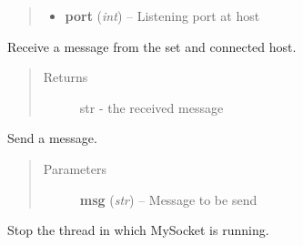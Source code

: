 \documentclass[letterpaper,10pt,english]{sphinxmanual}
\begin{document}
\begin{fulllineitems}
\begin{fulllineitems}
\begin{fulllineitems}
\begin{quote}
\begin{description}
\begin{itemize}
\item {} 
\textbf{port} (\emph{int}) -- Listening port at host

\end{itemize}

\end{description}\end{quote}

\end{fulllineitems}


\begin{fulllineitems}
\label{_static/code:FaceReader.FaceReader.MySocket.receive}
Receive a message from the set and connected host.
\begin{quote}\begin{description}
\item[{Returns}] \leavevmode
str - the received message

\end{description}\end{quote}

\end{fulllineitems}


\begin{fulllineitems}
\label{_static/code:FaceReader.FaceReader.MySocket.send}
Send a message.
\begin{quote}\begin{description}
\item[{Parameters}] \leavevmode
\textbf{msg} (\emph{str}) -- Message to be send

\end{description}\end{quote}

\end{fulllineitems}


\begin{fulllineitems}
\label{_static/code:FaceReader.FaceReader.MySocket.stop}
Stop the thread in which MySocket is running.

\end{fulllineitems}



\end{fulllineitems}
\end{fulllineitems}
\end{document}
